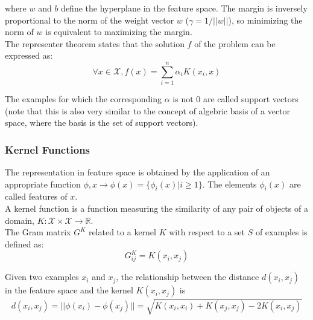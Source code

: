 where $w$ and $b$ define the hyperplane in the feature space. The margin is
inversely proportional to the norm of the weight vector $w$ ($\gamma =
1/||w||$), so minimizing the norm of $w$ is equivalent to maximizing the 
margin.\\
The representer theorem states that the solution $f$ of the problem can be
expressed as:
\begin{equation}
	\forall x \in \mathcal{X}, f(x) = \sum_{i=1}^n \alpha_i K(x_i, x)
\end{equation}

The examples for which the corresponding $\alpha$ is not $0$ are called support
vectors (note that this is also very similar to the concept of algebric basis of 
a vector space, where the basis is the set of support vectors).

\subsubsection{Kernel Functions}

The representation in feature space is obtained by the application of an
appropriate function $\phi, x \rightarrow \phi(x) = \{\phi_i(x)|i \geq 1\}$.
The elements $\phi_i(x)$ are called features of $x$.\\
A kernel function is a function measuring the similarity of any pair of objects
of a domain, $K: \mathcal{X} \times \mathcal{X} \rightarrow \mathbb{R}$.\\
The Gram matrix $G^K$ related to a kernel $K$ with respect to a set $S$ of
examples is defined as:
\begin{equation}
	G^K_{ij} = K(x_i, x_j)
\end{equation}

Given two examples $x_i$ and $x_j$, the relationship between the distance 
$d(x_i, x_j)$ in the feature space and the kernel $K(x_i, x_j)$ is 
\begin{equation}
	d(x_i, x_j) = ||\phi(x_i) - \phi(x_j)|| = \sqrt{K(x_i, x_i) + K(x_j, x_j) - 2K(x_i, x_j)}
\end{equation}

